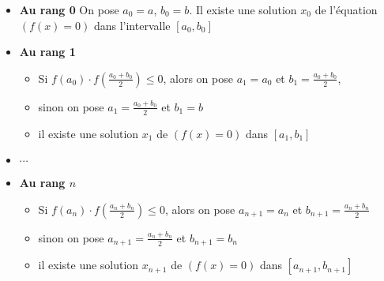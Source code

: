 \begin{frame}

\begin{itemize}
  \item {\bf Au rang 0} On pose $a_0=a$, $b_0=b$. Il existe une solution $x_0$ de l'équation $(f(x)=0)$ 
  dans l'intervalle $[a_0,b_0]$

\pause
\medskip

  \item {\bf Au rang 1}

  \begin{itemize}
  \item  Si $f(a_0)\cdot f(\frac{a_0+b_0}{2}) \le 0$, alors on pose $a_1=a_0$ et 
  $b_1=\frac{a_0+b_0}{2}$,
    \item sinon on pose $a_1=\frac{a_0+b_0}{2}$ et $b_1=b$
    \item il existe une solution $x_1$ de $(f(x)=0)$ dans $[a_1,b_1]$ 
  \end{itemize}
  
\pause  
\medskip
  
  \item $ \cdots$
  
\pause  
\medskip

  \item {\bf Au rang $n$}
  \begin{itemize}
    \item Si $f(a_n)\cdot f(\frac{a_n+b_n}{2}) \le 0$, alors on
   pose $a_{n+1}=a_n$ et $b_{n+1}=\frac{a_n+b_n}{2}$
    \item sinon on pose $a_{n+1}=\frac{a_n+b_n}{2}$ et $b_{n+1}=b_n$ 
    \item il existe une solution $x_{n+1}$ de $(f(x)=0)$ dans $[a_{n+1},b_{n+1}]$
  \end{itemize} 
\end{itemize}   
\end{frame}


